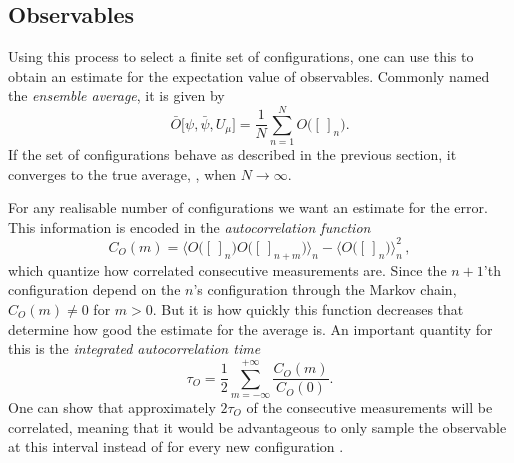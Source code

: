 \subsection{Observables}

Using this process to select a finite set of configurations, one can use this to
obtain an estimate for the expectation value of observables. 
Commonly named the \emph{ensemble average}, it is given by
%
\begin{equation}
  \bar{O}\big[\psi, \bar{\psi}, U_{\mu}\big] = \frac{1}{N} \sum_{n = 1}^N O\big( [\,]_n \big).
\end{equation}
%
If the set of configurations behave as described in the previous section, it
converges to the true average, , when $N \to
\infty$.

For any realisable number of configurations we want an estimate for the error.
This information is encoded in the \emph{autocorrelation function}
%
\begin{equation}
  C_{O}(m) = \big\langle O\big([\,]_n\big) O\big([\,]_{n+m}\big)\big\rangle_n
    - \big\langle O\big([\,]_n\big)\big\rangle_n^2\,,
\end{equation}
%
which quantize how correlated consecutive measurements are. Since the $n+1$'th
configuration depend on the $n$'s configuration through the Markov chain,
$C_O(m) \neq 0$ for $m > 0$. But it is how quickly this function decreases that
determine how good the estimate for the average is. An important quantity for
this is the \emph{integrated autocorrelation time}
%
\begin{equation}
  \tau_O = \frac{1}{2} \sum_{m=-\infty}^{+\infty} \frac{C_O(m)}{C_O(0)}.
\end{equation}
%
One can show that approximately $2 \tau_O$ of the consecutive measurements will
be correlated, meaning that it would be advantageous to only sample the
observable at this interval instead of for every new configuration
\citep[sect. 7.1.3]{montvay1997quantum}.
